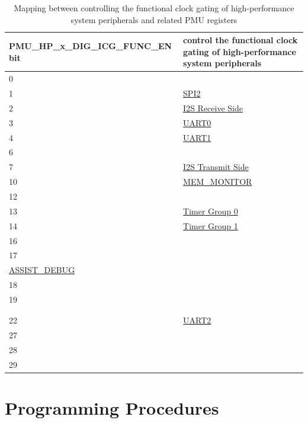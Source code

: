 \documentclass[main\_\_EN.tex]{subfiles}
\begin{document}
\begin{table}[H]
    \centering
    \caption{Mapping between controlling the functional clock gating of high-performance system peripherals and related PMU registers}\label{tab:clk_pmu_func}
\begin{tabular}{|l|l|}
\hline
\rowcolor{lightgray}
\textbf{PMU\_HP\_x\_DIG\_ICG\_FUNC\_EN bit} & \textbf{control the functional clock gating of high-performance system peripherals} \\ \hline
0   & \nameref{mod:dma}\\ \hline
1   & \hyperref[mod:spi]{SPI2}\\ \hline
2   & \hyperref[mod:i2s]{I2S Receive Side}\\ \hline
3   & \hyperref[mod:uart]{UART0}\\ \hline
4   & \hyperref[mod:uart]{UART1}\\ \hline
6   & \nameref{mod:usbserialjtag}\\ \hline
7   & \hyperref[mod:i2s]{I2S Transmit Side}\\ \hline
10  & \hyperref[mod:dbgassist]{MEM\_MONITOR}\\ \hline
12  & \nameref{mod:tmpsen}\\ \hline
13  & \hyperref[mod:timg]{Timer Group 0}\\ \hline
14  & \hyperref[mod:timg]{Timer Group 1}\\ \hline
16  & \nameref{mod:evntaskmatrix}\\ \hline
17  & \makecell[l]{\nameref{mod:riscvcpu}\\\hyperref[mod:dbgassist]{ASSIST\_DEBUG}}\\ \hline
18  & \nameref{mod:systimer}\\ \hline
19  & \makecell[l]{\nameref{mod:sha}\\\nameref{mod:ecc}\\\nameref{mod:ecdsa}}\\ \hline
22  & \hyperref[mod:uart]{UART2}\\ \hline
27  & \nameref{mod:ledpwm}   \\ \hline
28  & \nameref{mod:iomuxgpio}   \\ \hline
29  & \nameref{mod:i2c}   \\ \hline
\end{tabular}
\end{table}


\section{Programming Procedures}
\label{sec:resclk-prog-procedures}
\end{document}
